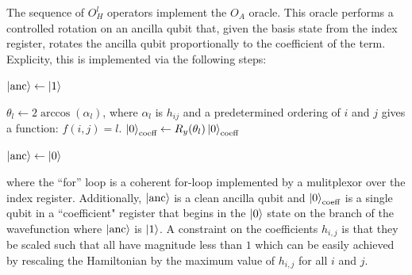 The sequence of $O_H^l$ operators implement the $O_A$ oracle.
This oracle performs a controlled rotation on an ancilla qubit that, given the basis state from the index register, rotates the ancilla qubit proportionally to the coefficient of the term.
Explicity, this is implemented via the following steps:
\begin{algorithmic}[1]
            \State $\ket{\text{anc}} \gets \ket{1}$
        \EndIf

            \State $\theta_l \gets 2\arccos(\alpha_l)$, where $\alpha_l$ is $h_{ij}$ and a predetermined ordering of $i$ and $j$ gives a function: $f(i, j) = l$.
            \State $\ket{0}_{\text{coeff}} \gets R_y(\theta_l) \ket{0}_{\text{coeff}}$ 
        \EndIf

        \State $\ket{\text{anc}} \gets \ket{0}$
    \EndFor
\end{algorithmic}
where the ``for'' loop is a coherent for-loop implemented by a mulitplexor over the index register.
Additionally, $\ket{\text{anc}}$ is a clean ancilla qubit and $\ket{0}_{\text{coeff}}$ is a single qubit in a ``coefficient" register that begins in the $\ket{0}$ state on the branch of the wavefunction where $\ket{\text{anc}}$ is $\ket{1}$. 
A constraint on the coefficients $h_{i, j}$ is that they be scaled such that all have magnitude less than $1$ which can be easily achieved by rescaling the Hamiltonian by the maximum value of $h_{i, j}$ for all $i$ and $j$.

